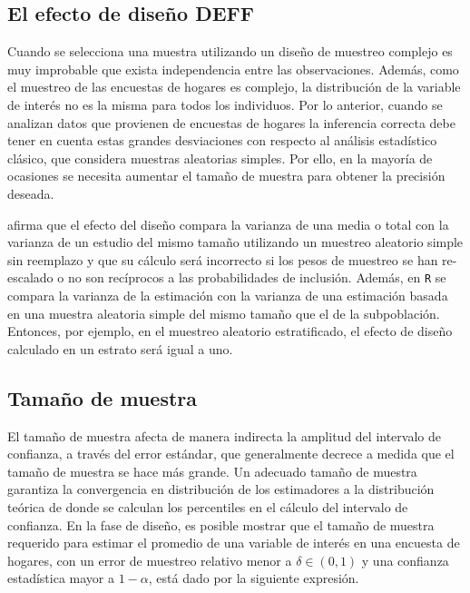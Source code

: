 \documentclass[
  12pt,
  spanish,
]{book}
\begin{document}
\hypertarget{el-efecto-de-diseuxf1o-deff}{%
\subsection{El efecto de diseño DEFF}\label{el-efecto-de-diseuxf1o-deff}}

Cuando se selecciona una muestra utilizando un diseño de muestreo complejo es muy improbable que exista independencia entre las observaciones. Además, como el muestreo de las encuestas de hogares es complejo, la distribución de la variable de interés no es la misma para todos los individuos. Por lo anterior, cuando se analizan datos que provienen de encuestas de hogares la inferencia correcta debe tener en cuenta estas grandes desviaciones con respecto al análisis estadístico clásico, que considera muestras aleatorias simples. Por ello, en la mayoría de ocasiones se necesita aumentar el tamaño de muestra para obtener la precisión deseada.

\citet{Lumley_2010} afirma que el efecto del diseño compara la varianza de una media o total con la varianza de un estudio del mismo tamaño utilizando un muestreo aleatorio simple sin reemplazo y que su cálculo será incorrecto si los pesos de muestreo se han re-escalado o no son recíprocos a las probabilidades de inclusión. Además, en \texttt{R} se compara la varianza de la estimación con la varianza de una estimación basada en una muestra aleatoria simple del mismo tamaño que el de la subpoblación. Entonces, por ejemplo, en el muestreo aleatorio estratificado, el efecto de diseño calculado en un estrato será igual a uno.

\hypertarget{tamauxf1o-de-muestra}{%
\subsection{Tamaño de muestra}\label{tamauxf1o-de-muestra}}

El tamaño de muestra afecta de manera indirecta la amplitud del intervalo de confianza, a través del error estándar, que generalmente decrece a medida que el tamaño de muestra se hace más grande. Un adecuado tamaño de muestra garantiza la convergencia en distribución de los estimadores a la distribución teórica de donde se calculan los percentiles en el cálculo del intervalo de confianza. En la fase de diseño, es posible mostrar que el tamaño de muestra requerido para estimar el promedio de una variable de interés en una encuesta de hogares, con un error de muestreo relativo menor a \(\delta \in (0,1)\) y una confianza estadística mayor a \(1-\alpha\), está dado por la siguiente expresión.
\end{document}
